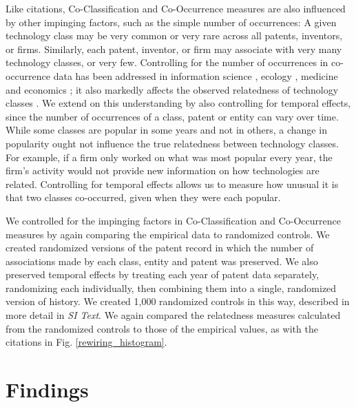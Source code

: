 \documentclass[pre,reprint,groupedaddress,superscriptaddress]{revtex4-1}
\begin{document}
Like citations, Co-Classification and Co-Occurrence measures are also influenced by other impinging factors, such as the simple number of occurrences: A given technology class may be very common or very rare across all patents, inventors, or firms.
Similarly, each patent, inventor, or firm may associate with very many technology classes, or very few.
Controlling for the number of occurrences in co-occurrence data has been addressed in information science%
, ecology%
, medicine %
and economics %
 \cite{Eck2009,Ulrich2007,Stone1990,Gobbi2014,Neffke2008}; it also markedly affects the observed relatedness of technology classes \cite{Bottazzi2010, Sanders2003}. We extend on this understanding by also controlling for temporal effects, since the number of occurrences of a class, patent or entity can vary over time. While some classes are popular in some years and not in others, a change in popularity ought not influence the true relatedness between technology classes. For example, if a firm only worked on what was most popular every year, the firm's activity would not provide new information on how technologies are related. Controlling for temporal effects allows us to measure how unusual it is that two classes co-occurred, given when they were each popular.

We controlled for the impinging factors in Co-Classification and Co-Occurrence measures by again comparing the empirical data to randomized controls. We created randomized versions of the patent record in which the number of associations made by each class, entity and patent was preserved. We also preserved temporal effects by treating each year of patent data separately, randomizing each individually, then combining them into a single, randomized version of history. We created 1,000 randomized controls in this way, described in more detail in \textit{SI Text}. We again compared the relatedness measures calculated from the randomized controls to those of the empirical values, as with the citations in Fig. \ref{rewiring_histogram}.

\section{Findings}
\end{document}
